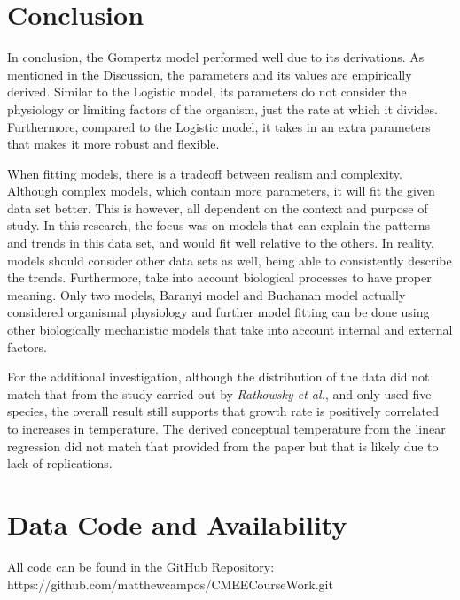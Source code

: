 \documentclass[11pt]{article}
\begin{document}
\section{Conclusion}
In conclusion, the Gompertz model performed well due to its derivations. As mentioned in the Discussion, the parameters and its values are empirically derived. Similar to the Logistic model, its parameters do not consider the physiology or limiting factors of the organism, just the rate at which it divides. Furthermore, compared to the Logistic model, it takes in an extra parameters that makes it more robust and flexible.

When fitting models, there is a tradeoff between realism and complexity. Although complex models, which contain more parameters, it will fit the given data set better. This is however, all dependent on the context and purpose of study. In this research, the focus was on  models that can explain the patterns and trends in this data set, and would fit well relative to the others. In reality, models should consider other data sets as well, being able to consistently describe the trends. Furthermore, take into account biological processes to have proper meaning. Only two models, Baranyi model and Buchanan model actually considered organismal physiology and further model fitting can be done using other biologically mechanistic models that take into account internal and external factors.

For the additional investigation, although the distribution of the data did not match that from the study carried out by \textit{Ratkowsky et al.}, and only used five species, the overall result still supports that growth rate is positively correlated to increases in temperature. The derived conceptual temperature from the linear regression did not match that provided from the paper but that is likely due to lack of replications.

\newpage

\section{Data Code and Availability}
All code can be found in the GitHub Repository:\\
{https://github.com/matthewcampos/CMEECourseWork.git}

\newpage



\end{document}
